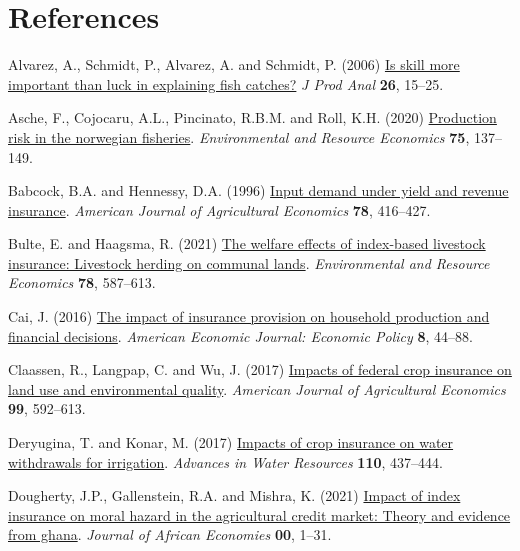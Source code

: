\documentclass[
  letterpaper,
  DIV=11,
  numbers=noendperiod]{scrartcl}
\newlength{\cslhangindent}
\newenvironment{CSLReferences}[2] %
 {\begin{list}{}{%
  \setlength{\itemindent}{0pt}
  \setlength{\leftmargin}{0pt}
  \setlength{\parsep}{0pt}
  \ifodd #1
   \setlength{\leftmargin}{\cslhangindent}
   \setlength{\itemindent}{-1\cslhangindent}
  \fi
  \setlength{\itemsep}{#2\baselineskip}}}
 {\end{list}}
\theoremstyle{plain}
\theoremstyle{plain}
\theoremstyle{remark}
\begin{document}
\section*{References}\label{references}

\label{refs}
\begin{CSLReferences}{1}{0}
Alvarez, A., Schmidt, P., Alvarez, A. and Schmidt, P. (2006)
\href{https://doi.org/10.1007/s11123-006-0002-x}{Is skill more important
than luck in explaining fish catches?} \emph{J Prod Anal} \textbf{26},
15--25.

Asche, F., Cojocaru, A.L., Pincinato, R.B.M. and Roll, K.H. (2020)
\href{https://doi.org/10.1007/s10640-019-00391-2}{Production risk in the
norwegian fisheries}. \emph{Environmental and Resource Economics}
\textbf{75}, 137--149.

Babcock, B.A. and Hennessy, D.A. (1996)
\href{https://doi.org/10.2307/1243713}{Input demand under yield and
revenue insurance}. \emph{American Journal of Agricultural Economics}
\textbf{78}, 416--427.

Bulte, E. and Haagsma, R. (2021)
\href{https://doi.org/10.1007/s10640-021-00545-1}{The welfare effects of
index-based livestock insurance: Livestock herding on communal lands}.
\emph{Environmental and Resource Economics} \textbf{78}, 587--613.

Cai, J. (2016) \href{https://doi.org/10.1257/pol.20130371}{The impact of
insurance provision on household production and financial decisions}.
\emph{American Economic Journal: Economic Policy} \textbf{8}, 44--88.

Claassen, R., Langpap, C. and Wu, J. (2017)
\href{https://doi.org/10.1093/AJAE/AAW075}{Impacts of federal crop
insurance on land use and environmental quality}. \emph{American Journal
of Agricultural Economics} \textbf{99}, 592--613.

Deryugina, T. and Konar, M. (2017)
\href{https://doi.org/10.1016/j.advwatres.2017.03.013}{Impacts of crop
insurance on water withdrawals for irrigation}. \emph{Advances in Water
Resources} \textbf{110}, 437--444.

Dougherty, J.P., Gallenstein, R.A. and Mishra, K. (2021)
\href{https://doi.org/10.1093/jafeco/ejab003}{Impact of index insurance
on moral hazard in the agricultural credit market: Theory and evidence
from ghana}. \emph{Journal of African Economies} \textbf{00}, 1--31.


\end{CSLReferences}
\end{document}
